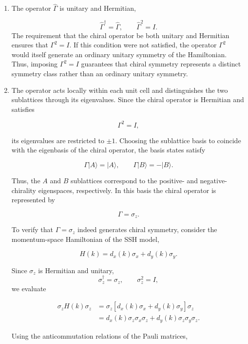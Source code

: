 \documentclass[11pt, a4paper]{article}
\begin{document}
\begin{enumerate}

\item
The operator $\hat{\Gamma}$ is unitary and Hermitian,

\begin{equation*}
\hat{\Gamma}^{\dagger}
=
\hat{\Gamma},
\qquad
\hat{\Gamma}^{2}
=
I.
\end{equation*}
The requirement that the chiral operator be both unitary and Hermitian ensures that
\(\Gamma^2=I\). If this condition were not satisfied, the operator
\(\Gamma^2\) would itself generate an ordinary unitary symmetry of the Hamiltonian.
Thus, imposing \(\Gamma^2=I\) guarantees that chiral symmetry represents a distinct
symmetry class rather than an ordinary unitary symmetry.

\item
The operator acts locally within each unit cell and distinguishes the two
sublattices through its eigenvalues. Since the chiral operator is Hermitian and
satisfies

\[
\Gamma^2=I,
\]

its eigenvalues are restricted to \(\pm1\). Choosing the sublattice basis to
coincide with the eigenbasis of the chiral operator, the basis states satisfy

\[
\Gamma|A\rangle=|A\rangle,
\qquad
\Gamma|B\rangle=-|B\rangle.
\]

Thus, the $A$ and $B$ sublattices correspond to the positive- and
negative-chirality eigenspaces, respectively. In this basis the chiral operator
is represented by

\[
\Gamma=\sigma_z.
\]

To verify that $\Gamma= \sigma_z$ indeed generates chiral symmetry, consider the momentum-space Hamiltonian of the SSH model,

\begin{equation}
H(k)=d_x(k)\sigma_x+d_y(k)\sigma_y .
\end{equation}

Since $\sigma_z$ is Hermitian and unitary,
\[
\sigma_z^\dagger=\sigma_z,\qquad \sigma_z^2=I,
\]
we evaluate

\begin{align}
\sigma_z H(k)\sigma_z
&=\sigma_z\left[d_x(k)\sigma_x+d_y(k)\sigma_y\right]\sigma_z \\
&=d_x(k)\sigma_z\sigma_x\sigma_z
+d_y(k)\sigma_z\sigma_y\sigma_z.
\end{align}

Using the anticommutation relations of the Pauli matrices,


\end{enumerate}
\end{document}
